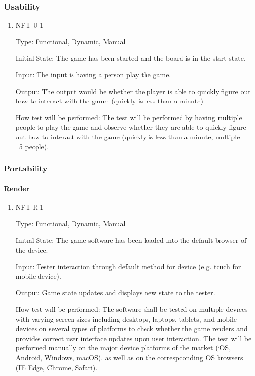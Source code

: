 \documentclass[12pt, titlepage]{article}
\begin{document}
\subsubsection{Usability}

\begin{enumerate}
	\item NFT-U-1

	      Type: Functional, Dynamic, Manual

	      Initial State: The game has been started and the board is in the start state.

	      Input: The input is having a person play the game.

	      Output: The output would be whether the player is able to quickly figure out how to interact with the game. (quickly is less than a minute).

	      How test will be performed: The test will be performed by having multiple people to play the game and observe whether they are able to quickly figure out how to interact with the game (quickly is less than a minute, multiple = ~5 people).
\end{enumerate}

\subsubsection{Portability}

\paragraph{Render}

\begin{enumerate}
	\item NFT-R-1

	      Type: Functional, Dynamic, Manual

	      Initial State: The game software has been loaded into the default browser of the device.

	      Input: Tester interaction through default method for device (e.g. touch for mobile device).

	      Output: Game state updates and displays new state to the tester.

	      How test will be performed: The software shall be tested on multiple devices with varying screen sizes including desktops, laptops, tablets, and mobile devices on several types of platforms to check whether the game renders and provides correct user interface updates upon user interaction. The test will be performed manually on the major device platforms of the market (iOS, Android, Windows, macOS). as well as on the correspoonding OS browsers (IE Edge, Chrome, Safari).
\end{enumerate}
\end{document}
